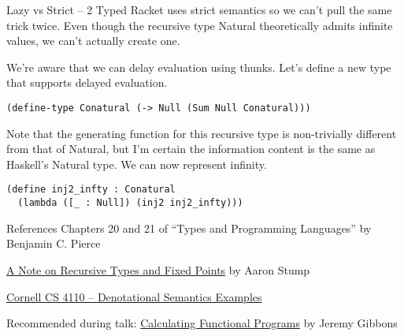 \documentclass[hyperref={colorlinks = true, urlcolor = blue},pdf]{beamer}
\begin{document}
\begin{frame}[fragile]{Lazy vs Strict -- 2}
  Typed Racket uses strict semantics so we can't pull the same trick twice. Even
  though the recursive type Natural theoretically admits infinite values, we
  can't actually create one.
  \medskip

  We're aware that we can delay evaluation using thunks. Let's define a new type
  that supports delayed evaluation.
\begin{verbatim}
(define-type Conatural (-> Null (Sum Null Conatural)))
\end{verbatim}
%
Note that the generating function for this recursive type is non-trivially
different from that of Natural, but I'm certain the information content is
the same as Haskell's Natural type. We can now represent infinity.
%
\begin{verbatim}
(define inj2_infty : Conatural 
  (lambda ([_ : Null]) (inj2 inj2_infty)))
\end{verbatim}
\end{frame}
\begin{frame}{References}
  Chapters 20 and 21 of ``Types and Programming Languages'' by Benjamin C.
  Pierce
  \medskip

  \href{https://homepage.cs.uiowa.edu/~astump/notes/recursive-types-and-fixed-points.pdf}
       {A Note on Recursive Types and Fixed Points} by Aaron Stump
  \medskip

  \href{https://www.cs.cornell.edu/courses/cs4110/2018fa/lectures/lecture08.pdf}
       {Cornell CS 4110 -- Denotational Semantics Examples}
  \medskip

  {\color{teal} Recommended during talk:}
  \href{https://www.researchgate.net/publication/2615046_Calculating_Functional_Programs}
       {Calculating Functional Programs} {\color{teal} by Jeremy Gibbons}
\end{frame}
\end{document}
